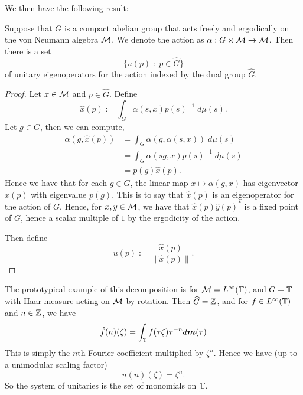 We then have the following result:
\begin{proposition}
    Suppose that $G$ is a compact abelian group that acts freely and ergodically
    on the von Neumann algebra $\mathcal{M}$. We denote the action as $\alpha:G\times\mathcal{M}\rightarrow\mathcal{M}$. 
    Then there is a set 
    \begin{equation}
        \{ u(p) \;:\; p \in \widehat{G}\}
    \end{equation}
    of unitary eigenoperators for the action indexed by the dual group $\widehat{G}$.
\end{proposition}
\begin{proof}
    Let $x \in \mathcal{M}$ and $p \in \widehat{G}$. Define
    \begin{equation}
        \hat{x}(p) := \int_G \alpha(s,x) p(s)^{-1} \;d\mu(s).
    \end{equation}
    Let $g \in G$, then we can compute,
    \begin{align}
        \alpha(g,\hat{x}(p)) &= \int_G \alpha(g,\alpha(s,x))\;d\mu(s)\\
                             &= \int_G \alpha(sg,x)p(s)^{-1} \;d\mu(s)\\
                             &= p(g)\hat{x}(p).
    \end{align}
    Hence we have that for each $g \in G$, the linear map $x \mapsto \alpha(g,x)$
    has eigenvector $\hat{x}(p)$ with eigenvalue $p(g)$. This is
    to say that $\hat{x}(p)$ is an eigenoperator for the action of $G$.
    Hence, for $x,y \in \mathcal{M}$, we have that $\hat{x}(p)\hat{y}(p)^*$ is a fixed
    point of $G$, hence a scalar multiple of $1$ by the ergodicity of the action.
    
    Then define
    \begin{equation}
        u(p) := \frac{\hat{x}(p)}{\|\hat{x}(p)\|}.
    \end{equation}
\end{proof} 
\begin{example}
    The prototypical example of this decomposition is for $\mathcal{M} = L^\infty(\mathbb{T})$,
    and $G = \mathbb{T}$ with Haar measure  acting on $\mathcal{M}$ by rotation. Then $\widehat{G} = \mathbb{Z}$,
    and for $f \in L^\infty(\mathbb{T})$ and $n \in \mathbb{Z}$, we have
    \begin{equation}
        \hat{f}(n)(\zeta) = \int_{\mathbb{T}} f(\tau\zeta) \tau^{-n} d\boldsymbol{m}(\tau)
    \end{equation}
    This is simply the $n$th Fourier coefficient multiplied by $\zeta^n$. Hence we have (up to a unimodular 
    scaling factor)
    \begin{equation}
        u(n)(\zeta) = \zeta^n.
    \end{equation}
    So the system of unitaries is the set of monomials on $\mathbb{T}$. 
\end{example}
